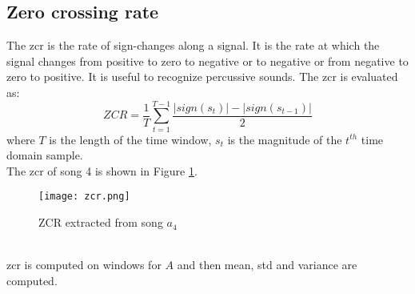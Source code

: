 \subsection{Zero crossing rate}
The \gls{zcr}  is the rate of sign-changes along a signal. It is the rate at which the signal changes from positive to zero to negative or to negative or from negative to zero to positive. It is useful to recognize percussive sounds.
The \gls{zcr} is evaluated as:
\begin{equation}
	ZCR=\dfrac{1}{T} \sum_{t=1}^{T-1}{\dfrac{|sign(s_t)|-|sign(s_{t-1})|}{2}}
\end{equation}
where $T$ is the length of the time window, $s_t$ is the magnitude of the $t^{th}$ time domain sample.
\\
The \gls{zcr} of song 4 is shown in Figure \ref{fig:zcr}.
\begin{figure}[h]
    \centering
    \texttt{[image: zcr.png]} 
	\caption{ZCR extracted from song $a_4$}
    \label{fig:zcr}
\end{figure}
\\
\gls{zcr} is computed on windows for $A$ and then mean, std and variance are computed.

